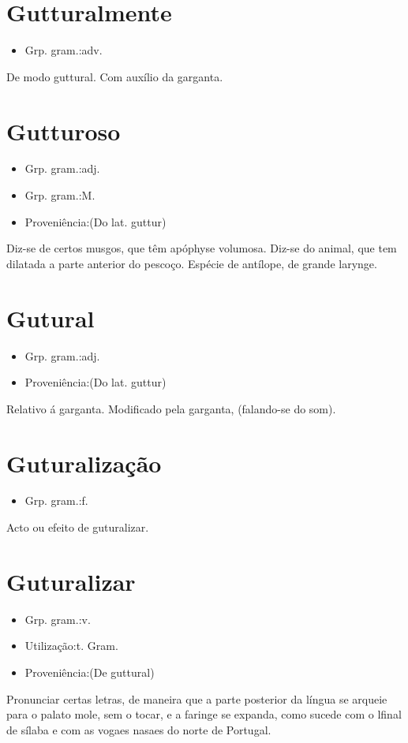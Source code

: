 \section{Gutturalmente}
\begin{itemize}
\item {Grp. gram.:adv.}
\end{itemize}
De modo guttural.
Com auxílio da garganta.
\section{Gutturoso}
\begin{itemize}
\item {Grp. gram.:adj.}
\end{itemize}
\begin{itemize}
\item {Grp. gram.:M.}
\end{itemize}
\begin{itemize}
\item {Proveniência:(Do lat. \textunderscore guttur\textunderscore )}
\end{itemize}
Diz-se de certos musgos, que têm apóphyse volumosa.
Diz-se do animal, que tem dilatada a parte anterior do pescoço.
Espécie de antílope, de grande larynge.
\section{Gutural}
\begin{itemize}
\item {Grp. gram.:adj.}
\end{itemize}
\begin{itemize}
\item {Proveniência:(Do lat. \textunderscore guttur\textunderscore )}
\end{itemize}
Relativo á garganta.
Modificado pela garganta, (falando-se do som).
\section{Guturalização}
\begin{itemize}
\item {Grp. gram.:f.}
\end{itemize}
Acto ou efeito de guturalizar.
\section{Guturalizar}
\begin{itemize}
\item {Grp. gram.:v.}
\end{itemize}
\begin{itemize}
\item {Utilização:t. Gram.}
\end{itemize}
\begin{itemize}
\item {Proveniência:(De \textunderscore guttural\textunderscore )}
\end{itemize}
Pronunciar certas letras, de maneira que a parte posterior da língua se arqueie para o palato mole, sem o tocar, e a faringe se expanda, como sucede com o \textunderscore l\textunderscore  final de sílaba e com as vogaes nasaes do norte de Portugal.

